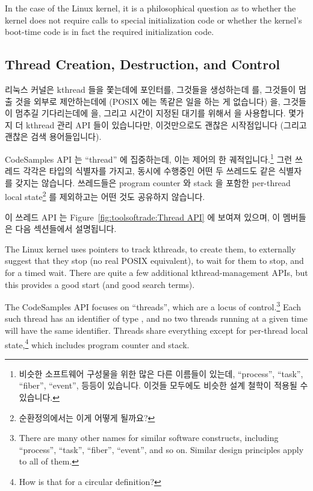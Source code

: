 In the case of the Linux kernel, it is a philosophical question as to
whether the kernel does not require calls to special initialization
code or whether the kernel's boot-time code is in fact the required
initialization code.
\fi

\subsection{Thread Creation, Destruction, and Control}
\label{sec:toolsoftrade:Thread Creation, Destruction, and Control}

리눅스 커널은 kthread 들을 쫓는데에  포인터를, 그것들을
생성하는데  를, 그것들이 멈출 것을 외부로 제안하는데에
(POSIX 에는 똑같은 일을 하는 게 없습니다)  을,
그것들이 멈추길 기다리는데에  을, 그리고 시간이 지정된
대기를 위해서  을 사용합니다.
몇가지 더 kthread 관리 API 들이 있습니다만, 이것만으로도 괜찮은 시작점입니다
(그리고 괜찮은 검색 용어들입니다).

CodeSamples API 는 ``thread'' 에 집중하는데, 이는 제어의 한
궤적입니다.\footnote{
	비슷한 소프트웨어 구성물을 위한 많은 다른 이름들이 있는데, ``process'',
	``task'', ``fiber'', ``event'', 등등이 있습니다.
	이것들 모두에도 비슷한 설계 철학이 적용될 수 있습니다.}
그런 쓰레드 각각은  타입의 식별자를 가지고, 동시에 수행중인
어떤 두 쓰레드도 같은 식별자를 갖지는 않습니다.
쓰레드들은 program counter 와 stack 을 포함한 per-thread local state\footnote{
	순환정의에서는 이게 어떻게 될까요?}
를 제외하고는 어떤 것도 공유하지 않습니다.

이 쓰레드 API 는
Figure~\ref{fig:toolsoftrade:Thread API} 에 보여져 있으며, 이 멤버들은 다음
섹션들에서 설명됩니다.
\iffalse

The Linux kernel uses
 pointers to track kthreads,
 to create them,
 to externally suggest that they stop
(no real POSIX equivalent),
 to wait for them to stop, and
 for a timed wait.
There are quite a few additional kthread-management APIs, but this
provides a good start (and good search terms).

The CodeSamples API focuses on ``threads'', which are a locus of
control.\footnote{
	There are many other names for similar software constructs, including
	``process'', ``task'', ``fiber'', ``event'', and so on.
	Similar design principles apply to all of them.}
Each such thread has an identifier of type ,
and no two threads running at a given time will have the same
identifier.
Threads share everything except for per-thread local state,\footnote{
	How is that for a circular definition?}
which includes program counter and stack.

